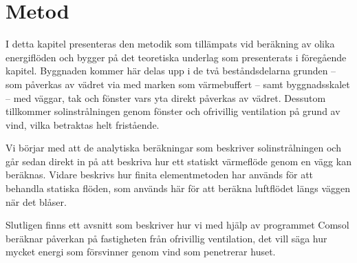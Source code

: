 \chapter{Metod}

I detta kapitel presenteras den metodik som tillämpats vid beräkning av olika energiflöden och bygger på det teoretiska underlag som presenterats i föregående kapitel. Byggnaden kommer här delas upp i de två beståndsdelarna grunden – som påverkas av vädret via med marken som värmebuffert – samt byggnadsskalet – med väggar, tak och fönster vars yta direkt påverkas av vädret. Dessutom tillkommer solinstrålningen genom fönster och ofrivillig ventilation på grund av vind, vilka betraktas helt fristående.

Vi börjar med att de analytiska beräkningar som beskriver solinstrålningen och går sedan direkt in på att beskriva hur ett statiskt värmeflöde genom en vägg kan beräknas. Vidare beskrivs hur finita elementmetoden har används för att behandla statiska flöden, som används här för att beräkna luftflödet längs väggen när det blåser.

Slutligen finns ett avsnitt som beskriver hur vi med hjälp av programmet Comsol beräknar påverkan på fastigheten från ofrivillig ventilation, det vill säga hur mycket energi som försvinner genom vind som penetrerar huset. 







